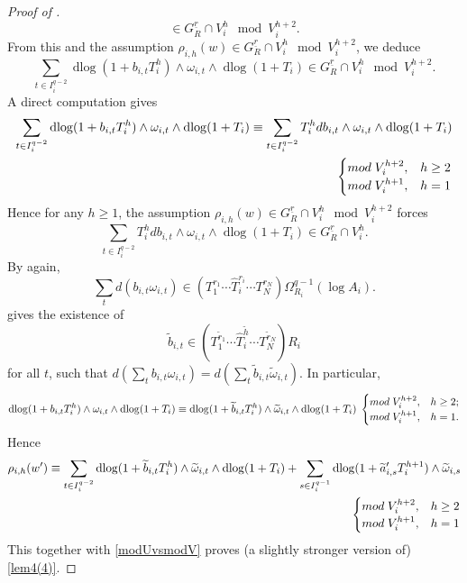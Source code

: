 \documentclass[11pt]{amsart}
\newcommand{\dlog}{\operatorname{dlog}}
\renewcommand{\hat}{\widehat}
\newcommand{\ul}{\underline}
\renewcommand{\tilde}{\widetilde}
\theoremstyle{plain}
\theoremstyle{definition}
\numberwithin{equation}{prop}
\begin{document}
\begin{proof}[Proof of ]
$$\in G_R^{\ul r}\cap V_i^{h}\mod V_i^{h+2}.$$
From this and the assumption
$\rho_{i,h}(w)\in G_R^{\ul r}\cap V_i^{h} \mod V_i^{h+2}$, we deduce
$$\sum_{t\in I_i^{q-2}} \dlog(1+b_{i,t}T_i^{h})\wedge\omega_{i,t}\wedge \dlog (1+T_i)
\in G_R^{\ul r} \cap V_i^{h}
\mod V_i^{h+2}.$$
A direct computation gives
\begin{align*}
\sum_{t\in I_i^{q-2}} \dlog(1+b_{i,t}T_i^{h})\wedge\omega_{i,t}\wedge \dlog (1+T_i)
\equiv \sum_{t\in I_i^{q-2}}
T_i^h db_{i,t}\wedge\omega_{i,t}\wedge \dlog (1+T_i)
\\
\begin{cases}
{\rm mod}\; V_i^{h+2},&h\ge 2\\
{\rm mod}\; V_i^{h+1},&h=1
\end{cases}
\end{align*}
Hence for any $h\ge 1$, the assumption
$\rho_{i,h}(w)\in G_R^{\ul r}\cap V_i^{h} \mod V_i^{h+2}$ forces 
$$\sum_{t\in I_i^{q-2}}
T_i^h db_{i,t}\wedge\omega_{i,t}\wedge \dlog (1+T_i)
\in G_R^{\ul r} \cap V_i^{h}.$$
By  again, 
$$\sum_t d(b_{i,t}\omega_{i,t})\in (T_1^{r_1}\cdots\hat T_i^{r_i}\cdots  T_N^{r_N})\Omega^{q-1}_{R_i}(\log A_i).$$
 gives the existence of 
$$\tilde b_{i,t}\in (T_1^{\tilde r_1}\cdots \hat T_i^{\tilde h}\cdots T_N^{\tilde r_N})R_i$$
for all $t$, such that
$d(\sum_t b_{i,t}\omega_{i,t})=d(\sum_t \tilde b_{i,t}\tilde \omega_{i,t}).$
In particular, 
$$\dlog(1+b_{i,t}T_i^{h})\wedge\omega_{i,t}\wedge \dlog (1+T_i)
\equiv 
\dlog(1+\tilde b_{i,t}T_i^{h})\wedge\tilde\omega_{i,t}\wedge \dlog (1+T_i)
\;
\begin{cases}
{\rm mod}\; V_i^{h+2},&h\ge 2;\\
{\rm mod}\; V_i^{h+1},&h=1.
\end{cases}
$$
Hence
\begin{align*} 
\rho_{i,h}(w')
\equiv 
\sum_{t\in I_i^{q-2}} 
\dlog(1+\tilde b_{i,t}T_i^{h})\wedge\tilde\omega_{i,t}\wedge \dlog (1+T_i)
+
\sum_{s\in I_i^{q-1}} \dlog(1+\tilde a'_{i,s}T_i^{h+1})\wedge\tilde\omega_{i,s}
\\
\begin{cases}
{\rm mod}\; V_i^{h+2},&h\ge 2\\
{\rm mod}\; V_i^{h+1},&h=1
\end{cases}
\end{align*}
This together with \eqref{modUvsmodV} proves (a slightly stronger version of) \eqref{lem4(4)}.






\end{proof}
\end{document}
